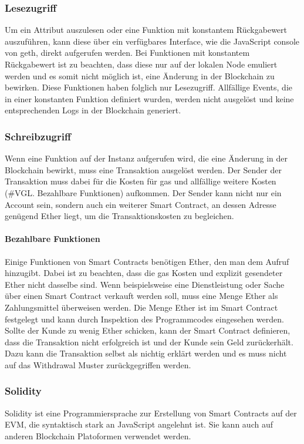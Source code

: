\subsubsection{Lesezugriff}
\label{subsubsec:Lesezugriff}
Um ein Attribut auszulesen oder eine Funktion mit konstantem Rückgabewert auszuführen, kann diese über ein verfügbares Interface, wie die JavaScript console von geth, direkt aufgerufen werden. Bei Funktionen mit konstantem Rückgabewert ist zu beachten, dass diese nur auf der lokalen Node emuliert werden und es somit nicht möglich ist, eine Änderung in der Blockchain zu bewirken.\cite{media.consensys.net/events-and-logs} Diese Funktionen haben folglich nur Lesezugriff. Allfällige Events, die in einer konstanten Funktion definiert wurden, werden nicht ausgelöst und keine entsprechenden Logs in der Blockchain generiert.

\subsubsection{Schreibzugriff}
\label{subsubsec:Schreibzugriff}
Wenn eine Funktion auf der Instanz aufgerufen wird, die eine Änderung in der Blockchain bewirkt, muss eine Transaktion ausgelöst werden. Der Sender der Transaktion muss dabei für die Kosten für gas und allfällige weitere Kosten (\#VGL. Bezahlbare Funktionen) aufkommen. Der Sender kann nicht nur ein Account sein, sondern auch ein weiterer Smart Contract, an dessen Adresse genügend Ether liegt, um die Transaktionskosten zu begleichen.

\paragraph{Bezahlbare Funktionen}
Einige Funktionen von Smart Contracts benötigen Ether, den man dem Aufruf hinzugibt. Dabei ist zu beachten, dass die gas Kosten und explizit gesendeter Ether nicht dasselbe sind. Wenn beispielsweise eine Dienstleistung oder Sache über einen Smart Contract verkauft werden soll, muss eine Menge Ether als Zahlungsmittel überweisen werden. Die Menge Ether ist im Smart Contract festgelegt und kann durch Inspektion des Programmcodes eingesehen werden. Sollte der Kunde zu wenig Ether schicken, kann der Smart Contract definieren, dass die Transaktion nicht erfolgreich ist und der Kunde sein Geld zurückerhält. Dazu kann die Transaktion selbst als nichtig erklärt werden und es muss nicht auf das Withdrawal Muster zurückgegriffen werden.\cite{solidity.readthedocs.io}

\subsubsection{Solidity}
\label{subsubsec:Solidity}
Solidity ist eine Programmiersprache zur Erstellung von Smart Contracts auf der \acrfull{EVM}, die syntaktisch stark an JavaScript angelehnt ist. Sie kann auch auf anderen Blockchain Platoformen verwendet werden.\cite{cryptocoinnews.com/smart-contract-bitcoin,github.com/hyperledger/burrow}

